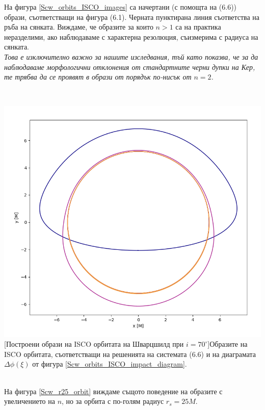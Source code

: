 \begin{minipage}{20em}
На фигура \ref{Scw_orbits_ISCO_images} са начертани (с помощта на (6.6)) образи, съответстващи на фигура (6.1). Черната пунктирана линия съответства на ръба на сянката. Виждаме, че образите за които $n>1$ са на практика неразделими, ако наблюдаваме с характерна резолюция, съизмерима с радиуса на сянката.\\

\emph{Това е изключително важно за нашите изследвания, тъй като показва, че за да наблюдаваме морфологични отклонения от стандартните черни дупки на Кер, те трябва да се проявят в образи от порядък по-нисък от $n = 2$.}
\end{minipage}\,\,\,
\begin{minipage}{16em}
	\includegraphics[scale = 0.3]{Schw_70_deg_ISCO.png}
	[Построени образи на ISCO орбитата на Шварцшилд при $i = 70^\circ$]{\small Образите на ISCO орбитата, съответстващи на решенията на системата (6.6) и на диаграмата $\Delta\phi(\xi)$ от фигура \ref{Scw_orbits_ISCO_impact_diagram}.}
	\label{Scw_orbits_ISCO_images}
\end{minipage}\\

На фигура \ref{Scw_r25_orbit} виждаме същото поведение на образите с увеличението на $n$, но за орбита с по-голям радиус $r_s = 25M$.

